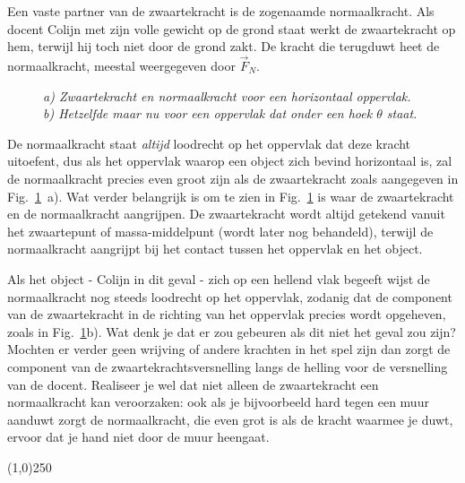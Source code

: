 Een vaste partner van de zwaartekracht is de zogenaamde normaalkracht. Als docent Colijn
met zijn volle gewicht op de grond staat werkt de zwaartekracht op hem, terwijl hij toch niet
door de grond zakt. De kracht die terugduwt heet de normaalkracht, meestal weergegeven
door $\vec{F}_N$. 
 \begin{figure}[htbp]
\begin{center}
\caption{{\it a) Zwaartekracht en normaalkracht voor een horizontaal oppervlak. b) Hetzelfde maar
nu voor een oppervlak dat onder een hoek $\theta$ staat.}}
\label{fig:norm}
\end{center}
\end{figure} 
De normaalkracht staat {\it altijd} loodrecht op het oppervlak dat deze kracht uitoefent,
dus als het oppervlak waarop een object zich bevind horizontaal is, zal de normaalkracht 
precies even groot zijn als de zwaartekracht zoals aangegeven in Fig.~\ref{fig:norm}~a). 
Wat verder belangrijk is om  te zien in Fig.~\ref{fig:norm} is waar de zwaartekracht en de 
normaalkracht aangrijpen. De zwaartekracht wordt altijd getekend vanuit het zwaartepunt of 
massa-middelpunt (wordt later nog behandeld), terwijl de normaalkracht aangrijpt bij het contact
tussen het oppervlak en het object.

Als  het object - Colijn in dit geval - zich op een hellend vlak begeeft wijst de normaalkracht 
nog steeds
loodrecht op het oppervlak, zodanig dat de component van de zwaartekracht in de richting van het 
oppervlak precies wordt opgeheven, zoals in Fig.~\ref{fig:norm}b).  Wat denk je dat er zou 
gebeuren als dit niet het geval zou zijn? Mochten er verder geen wrijving 
of andere krachten in het spel zijn dan zorgt de component van de zwaartekrachtsversnelling 
langs de helling voor de versnelling van de docent. Realiseer je wel dat niet alleen de 
zwaartekracht een normaalkracht kan veroorzaken: ook als je bijvoorbeeld hard tegen een muur 
aanduwt zorgt de normaalkracht, die even grot is als de kracht waarmee je duwt, ervoor dat je 
hand niet door de muur heengaat.

\begin{center}
\line(1,0){250}
\end{center}

